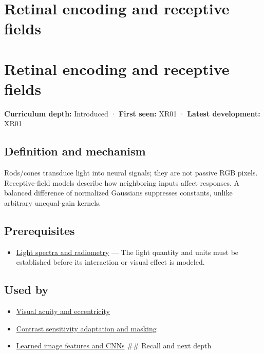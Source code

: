 \hypertarget{appendix-7281c15ac44a}{}
\section*{Retinal encoding and receptive fields}
\section{Retinal encoding and receptive fields}\label{appendix-7281c15ac44a-retinal-encoding-and-receptive-fields}

\textbf{Curriculum depth:} Introduced · \textbf{First seen:} XR01 · \textbf{Latest development:} XR01

\subsection{Definition and mechanism}\label{appendix-7281c15ac44a-definition-and-mechanism}

Rods/cones transduce light into neural signals; they are not passive RGB pixels. Receptive-field models describe how neighboring inputs affect responses. A balanced difference of normalized Gaussians suppresses constants, unlike arbitrary unequal-gain kernels.

\subsection{Prerequisites}\label{appendix-7281c15ac44a-prerequisites}

\begin{itemize}
\tightlist
\item
  \hyperref[appendix-215c2570199b]{Light spectra and radiometry} --- The light quantity and units must be established before its interaction or visual effect is modeled.
\end{itemize}

\subsection{Used by}\label{appendix-7281c15ac44a-used-by}

\begin{itemize}
\item
  \hyperref[appendix-b491fc48c54b]{Visual acuity and eccentricity}
\item
  \hyperref[appendix-b3aa9e8e01ad]{Contrast sensitivity adaptation and masking}
\item
  \hyperref[appendix-47c51ea026fb]{Learned image features and CNNs} \#\# Recall and next depth
\end{itemize}

